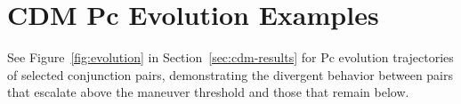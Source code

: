 \documentclass{article}
\begin{document}
\section{CDM Pc Evolution Examples}
\label{app:evolution}

See Figure~\ref{fig:evolution} in Section~\ref{sec:cdm-results} for Pc evolution trajectories of selected conjunction pairs, demonstrating the divergent behavior between pairs that escalate above the maneuver threshold and those that remain below.
\end{document}
